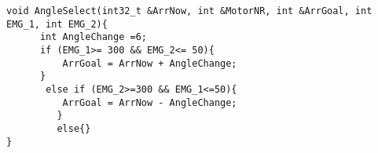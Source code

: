 

\begin{lstlisting}[frame=single,language=Arduino]
void AngleSelect(int32_t &ArrNow, int &MotorNR, int &ArrGoal, int EMG_1, int EMG_2){
      int AngleChange =6;
      if (EMG_1>= 300 && EMG_2<= 50){
          ArrGoal = ArrNow + AngleChange;
      }
       else if (EMG_2>=300 && EMG_1<=50){
          ArrGoal = ArrNow - AngleChange;
         }
         else{}
}
\end{lstlisting} \label{fig:AS}
